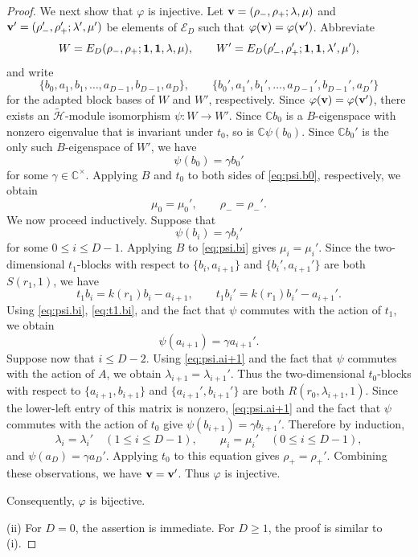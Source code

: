 \documentclass[reqno]{amsart}
\theoremstyle{definition}
\begin{document}
\begin{proof}
We next show that $\varphi$ is injective.
Let
${\bf v}=(\rho_-,\rho_+;\lambda,\mu)$ and ${\bf v}'=(\rho_-',\rho_+';\lambda',\mu')$
be elements of $\mathcal{E}_D$ such that
$\varphi({\bf v})=\varphi({\bf v}')$.
Abbreviate
$$
W=E_D(\rho_-,\rho_+;{\bf 1},{\bf 1},\lambda,\mu),
\qquad
W'=E_D(\rho_-',\rho_+';{\bf 1},{\bf 1},\lambda',\mu'),
$$
and write
$$
\{b_0,a_1,b_1,\dots,a_{D-1},b_{D-1},a_D\},
\qquad
\{b_0',a_1',b_1',\dots,a_{D-1}',b_{D-1}',a_D'\}
$$
for the adapted block bases of $W$ and $W'$, respectively.
Since $\varphi({\bf v})=\varphi({\bf v}')$, there exists an
$\widetilde{\mathcal H}$-module isomorphism
$\psi: W \to W'$.
Since $\mathbb{C}b_0$ is a $B$-eigenspace with nonzero eigenvalue that is invariant under $t_0$, so is $\mathbb{C}\psi(b_0)$.
Since $\mathbb{C}b_0'$ is the only such $B$-eigenspace of $W'$, we have
\begin{equation}\label{eq:psi.b0}
\psi(b_0)=\gamma b_0'
\end{equation}
for some $\gamma\in\mathbb{C}^{\times}$.
Applying $B$ and $t_0$ to both sides of \eqref{eq:psi.b0}, respectively, we obtain
$$
\mu_0=\mu_0',
\qquad
\rho_-=\rho_-'.
$$
We now proceed inductively.
Suppose that
\begin{equation}\label{eq:psi.bi}
\psi(b_i)=\gamma b_i'
\end{equation}
for some $0\leq i\leq D-1$.
Applying $B$ to \eqref{eq:psi.bi} gives
$\mu_i=\mu_i'$.
Since the two-dimensional $t_1$-blocks with respect to
$\{b_i,a_{i+1}\}$ and $\{b_i',a_{i+1}'\}$ are both $S(r_1,1)$, we have
\begin{equation}\label{eq:t1.bi}
t_1b_i=k(r_1)b_i-a_{i+1},
\qquad
t_1b_i'=k(r_1)b_i'-a_{i+1}'.
\end{equation}
Using \eqref{eq:psi.bi}, \eqref{eq:t1.bi}, and the fact that $\psi$ commutes with the action of $t_1$, we obtain
\begin{equation}\label{eq:psi.ai+1}
\psi(a_{i+1})=\gamma a_{i+1}'.
\end{equation}
%
Suppose now that $i\leq D-2$.
Using \eqref{eq:psi.ai+1} and the fact that $\psi$ commutes with the action of $A$, we obtain
$\lambda_{i+1}=\lambda_{i+1}'$.
Thus the two-dimensional $t_0$-blocks with respect to
$\{a_{i+1},b_{i+1}\}$ and
$\{a_{i+1}',b_{i+1}'\}$ are both
$R(r_0,\lambda_{i+1},1)$.
Since the lower-left entry of this matrix is nonzero, \eqref{eq:psi.ai+1} and the fact that $\psi$ commutes with the action of $t_0$ give
$\psi(b_{i+1})=\gamma b_{i+1}'$.
Therefore by induction,
$$
\lambda_i=\lambda_i'
\quad (1\leq i\leq D-1),
\qquad 
\mu_i=\mu_i'
\quad (0\leq i\leq D-1),
$$
and
$\psi(a_D)=\gamma a_D'$.
Applying $t_0$ to this equation gives
$\rho_+=\rho_+'$.
Combining these observations, we have ${\bf v}={\bf v}'$.
Thus $\varphi$ is injective.

Consequently, $\varphi$ is bijective.

(ii) For $D=0$, the assertion is immediate.
For $D\geq 1$, the proof is similar to (i).
%
\end{proof}
\end{document}
